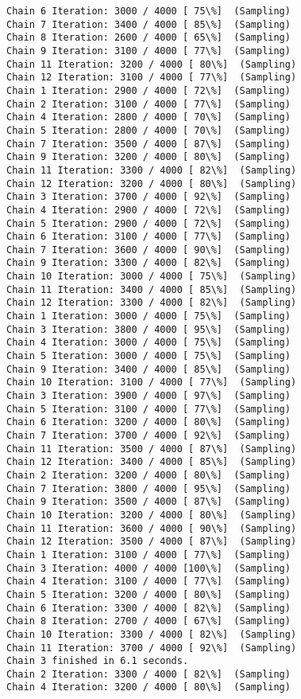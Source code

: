 \documentclass[11pt]{article}
\begin{document}
\begin{Verbatim}[commandchars=\\\{\}]
Chain 6 Iteration: 3000 / 4000 [ 75\%]  (Sampling)
Chain 7 Iteration: 3400 / 4000 [ 85\%]  (Sampling)
Chain 8 Iteration: 2600 / 4000 [ 65\%]  (Sampling)
Chain 9 Iteration: 3100 / 4000 [ 77\%]  (Sampling)
Chain 11 Iteration: 3200 / 4000 [ 80\%]  (Sampling)
Chain 12 Iteration: 3100 / 4000 [ 77\%]  (Sampling)
Chain 1 Iteration: 2900 / 4000 [ 72\%]  (Sampling)
Chain 2 Iteration: 3100 / 4000 [ 77\%]  (Sampling)
Chain 4 Iteration: 2800 / 4000 [ 70\%]  (Sampling)
Chain 5 Iteration: 2800 / 4000 [ 70\%]  (Sampling)
Chain 7 Iteration: 3500 / 4000 [ 87\%]  (Sampling)
Chain 9 Iteration: 3200 / 4000 [ 80\%]  (Sampling)
Chain 11 Iteration: 3300 / 4000 [ 82\%]  (Sampling)
Chain 12 Iteration: 3200 / 4000 [ 80\%]  (Sampling)
Chain 3 Iteration: 3700 / 4000 [ 92\%]  (Sampling)
Chain 4 Iteration: 2900 / 4000 [ 72\%]  (Sampling)
Chain 5 Iteration: 2900 / 4000 [ 72\%]  (Sampling)
Chain 6 Iteration: 3100 / 4000 [ 77\%]  (Sampling)
Chain 7 Iteration: 3600 / 4000 [ 90\%]  (Sampling)
Chain 9 Iteration: 3300 / 4000 [ 82\%]  (Sampling)
Chain 10 Iteration: 3000 / 4000 [ 75\%]  (Sampling)
Chain 11 Iteration: 3400 / 4000 [ 85\%]  (Sampling)
Chain 12 Iteration: 3300 / 4000 [ 82\%]  (Sampling)
Chain 1 Iteration: 3000 / 4000 [ 75\%]  (Sampling)
Chain 3 Iteration: 3800 / 4000 [ 95\%]  (Sampling)
Chain 4 Iteration: 3000 / 4000 [ 75\%]  (Sampling)
Chain 5 Iteration: 3000 / 4000 [ 75\%]  (Sampling)
Chain 9 Iteration: 3400 / 4000 [ 85\%]  (Sampling)
Chain 10 Iteration: 3100 / 4000 [ 77\%]  (Sampling)
Chain 3 Iteration: 3900 / 4000 [ 97\%]  (Sampling)
Chain 5 Iteration: 3100 / 4000 [ 77\%]  (Sampling)
Chain 6 Iteration: 3200 / 4000 [ 80\%]  (Sampling)
Chain 7 Iteration: 3700 / 4000 [ 92\%]  (Sampling)
Chain 11 Iteration: 3500 / 4000 [ 87\%]  (Sampling)
Chain 12 Iteration: 3400 / 4000 [ 85\%]  (Sampling)
Chain 2 Iteration: 3200 / 4000 [ 80\%]  (Sampling)
Chain 7 Iteration: 3800 / 4000 [ 95\%]  (Sampling)
Chain 9 Iteration: 3500 / 4000 [ 87\%]  (Sampling)
Chain 10 Iteration: 3200 / 4000 [ 80\%]  (Sampling)
Chain 11 Iteration: 3600 / 4000 [ 90\%]  (Sampling)
Chain 12 Iteration: 3500 / 4000 [ 87\%]  (Sampling)
Chain 1 Iteration: 3100 / 4000 [ 77\%]  (Sampling)
Chain 3 Iteration: 4000 / 4000 [100\%]  (Sampling)
Chain 4 Iteration: 3100 / 4000 [ 77\%]  (Sampling)
Chain 5 Iteration: 3200 / 4000 [ 80\%]  (Sampling)
Chain 6 Iteration: 3300 / 4000 [ 82\%]  (Sampling)
Chain 8 Iteration: 2700 / 4000 [ 67\%]  (Sampling)
Chain 10 Iteration: 3300 / 4000 [ 82\%]  (Sampling)
Chain 11 Iteration: 3700 / 4000 [ 92\%]  (Sampling)
Chain 3 finished in 6.1 seconds.
Chain 2 Iteration: 3300 / 4000 [ 82\%]  (Sampling)
Chain 4 Iteration: 3200 / 4000 [ 80\%]  (Sampling)

\end{Verbatim}
\end{document}
